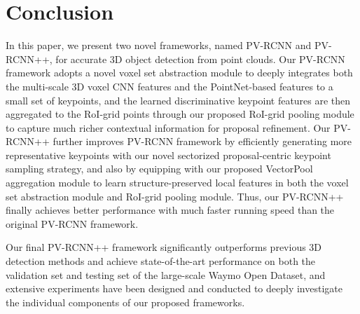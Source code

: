 \documentclass[natbib,twocolumn]{svjour3}          \smartqed  \usepackage{graphicx}
\begin{document}
\section{Conclusion}
In this paper, we present two novel frameworks, named PV-RCNN and PV-RCNN++, for accurate 3D object detection from point clouds. 
Our PV-RCNN framework adopts a novel voxel set abstraction module to deeply integrates both the multi-scale 3D voxel CNN features and the PointNet-based features to a small set of keypoints, and the learned discriminative keypoint features are then aggregated to the RoI-grid points through our proposed RoI-grid pooling module to capture much richer contextual information for proposal refinement. 
Our PV-RCNN++ further improves PV-RCNN framework by efficiently generating more representative keypoints with our novel sectorized proposal-centric keypoint sampling strategy, and also by equipping with our proposed VectorPool aggregation module to learn structure-preserved local features in both the voxel set abstraction module and RoI-grid pooling module. Thus, our PV-RCNN++ finally achieves better performance with much faster running speed than the original PV-RCNN framework.

Our final PV-RCNN++ framework significantly outperforms previous 3D detection methods and achieve state-of-the-art performance on both the validation set and testing set of the large-scale Waymo Open Dataset, and extensive experiments have been designed and conducted to deeply investigate the individual components of our proposed frameworks.  



         
\end{document}
